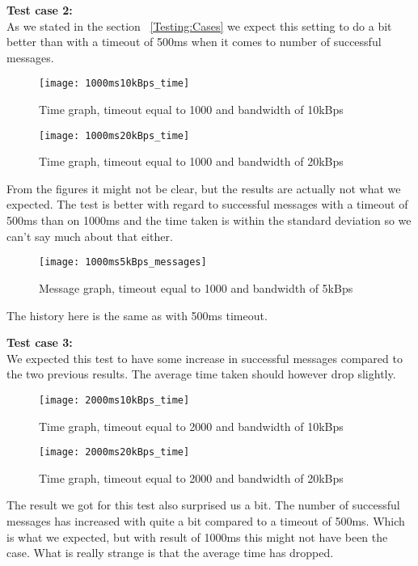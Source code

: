     \textbf{Test case 2:}\\
    As we stated in the section ~\ref{Testing:Cases} we expect this setting to do a bit better than with a timeout of 500ms when it comes to number of successful messages.
    \begin{figure}[H]
		\centering
		\texttt{[image: 1000ms10kBps\_time]}
		\caption{Time graph, timeout equal to 1000 and bandwidth of 10kBps} 
		\label{figure:results:1000ms10kBps_time}
	\end{figure}
	
	\begin{figure}[H]
		\centering
		\texttt{[image: 1000ms20kBps\_time]}
		\caption{Time graph, timeout equal to 1000 and bandwidth of 20kBps} 
		\label{figure:results:1000ms20kBps_time}
	\end{figure}
	
	From the figures it might not be clear, but the results are actually not what we expected. The test is better with regard to successful messages with a timeout of 500ms than on 1000ms and the time taken is within the standard deviation so we can't say much about that either.
	
	\begin{figure}[H]
		\centering
		\texttt{[image: 1000ms5kBps\_messages]}
		\caption{Message graph, timeout equal to 1000 and bandwidth of 5kBps} 
		\label{figure:results:1000ms5kBps_messages}
	\end{figure}
	
	The history here is the same as with 500ms timeout.
    
    \textbf{Test case 3:}\\
    We expected this test to have some increase in successful messages compared to the two previous results. The average time taken should however drop slightly.
    \begin{figure}[H]
		\centering
		\texttt{[image: 2000ms10kBps\_time]}
		\caption{Time graph, timeout equal to 2000 and bandwidth of 10kBps} 
		\label{figure:results:2000ms10kBps_time}
	\end{figure}
	
	\begin{figure}[H]
		\centering
		\texttt{[image: 2000ms20kBps\_time]}
		\caption{Time graph, timeout equal to 2000 and bandwidth of 20kBps} 
		\label{figure:results:2000ms20kBps_time}
	\end{figure}
	
	The result we got for this test also surprised us a bit. The number of successful messages has increased with quite a bit compared to a timeout of 500ms. Which is what we expected, but with result of 1000ms this might not have been the case. What is really strange is that the average time has dropped.
	
